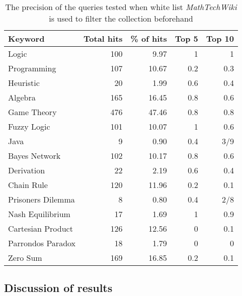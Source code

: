 \begin{table}[H]
\centering
\begin{tabular} {|| p{10em} | r | r | r | r ||} 
 \hline
 Keyword & Total hits & \% of hits & Top 5 & Top 10 \\ [0.5ex] 
 \hline

Logic & 100 & 9.97 & 1 & 1 \\
Programming & 107 & 10.67 & 0.2 & 0.3 \\
Heuristic & 20 & 1.99 & 0.6 & 0.4 \\
Algebra & 165 & 16.45 & 0.8 & 0.6 \\
Game Theory & 476 & 47.46 & 0.8 & 0.8 \\
\hline
Fuzzy Logic & 101 & 10.07 & 1 & 0.6 \\
Java & 9 & 0.90 & 0.4 & 3/9 \\
Bayes Network & 102 & 10.17 & 0.8 & 0.6 \\
Derivation & 22 & 2.19 & 0.6 & 0.4 \\
\hline
Chain Rule & 120 & 11.96 & 0.2 & 0.1 \\
Prisoners Dilemma & 8 & 0.80 & 0.4 & 2/8 \\
Nash Equilibrium & 17 & 1.69 & 1 & 0.9 \\
Cartesian Product & 126 & 12.56 & 0 & 0.1 \\
Parrondos Paradox & 18 & 1.79 & 0 & 0 \\
Zero Sum & 169 & 16.85 & 0.2 & 0.1 \\

 \hline
\end{tabular}
\caption{The precision of the queries tested when white list \textit{MathTechWiki} is used to filter the collection beforehand}
\label{table:p_test_list4}
\end{table}


\subsection{Discussion of results}

